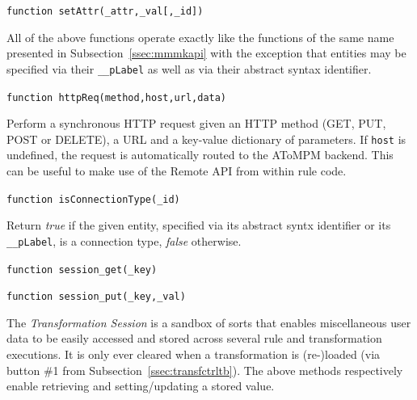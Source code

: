\documentclass{article}
\numberwithin{equation}{section}
\numberwithin{figure}{section}
\begin{document}
\begin{center}	{\large \texttt{function setAttr(\_attr,\_val[,\_id])}} \end{center}
All of the above functions operate exactly like the functions of the same name presented in Subsection~\ref{ssec:mmmkapi} with the exception that entities may be specified via their \texttt{\_\_pLabel} as well as via their abstract syntax identifier.\\
\vspace*{1em}


\begin{center}	{\large \texttt{function httpReq(method,host,url,data)}} \end{center}
Perform a synchronous HTTP request given an HTTP method (GET, PUT, POST or DELETE), a URL and a key-value dictionary of parameters. If \texttt{host} is undefined, the request is automatically routed to the AToMPM backend. This can be useful to make use of the Remote API from within rule code.\\
\vspace*{1em}


\begin{center}	{\large \texttt{function isConnectionType(\_id)}} \end{center}

Return \textit{true} if the given entity, specified via its abstract syntx identifier or its \texttt{\_\_pLabel}, is a connection type, \textit{false} otherwise.\\
\vspace*{1em}


\begin{center}	{\large \texttt{function session\_get(\_key)}} \end{center}


\begin{center}	{\large \texttt{function session\_put(\_key,\_val)}} \end{center}

The \textit{Transformation Session} is a sandbox of sorts that enables miscellaneous user data to be easily accessed and stored across several rule and transformation executions. It is only ever cleared when a transformation is (re-)loaded (via button \#1 from Subsection~\ref{ssec:transfctrltb}). The above methods respectively enable retrieving and setting/updating a stored value.\\
\vspace*{1em}
\end{document}
